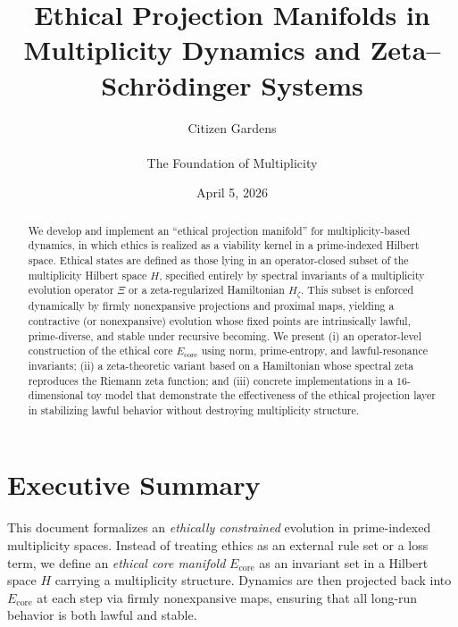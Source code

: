 \documentclass[11pt]{article}
\title{Ethical Projection Manifolds in Multiplicity Dynamics and Zeta--Schr\"odinger Systems}
\author{Citizen Gardens \\ \\ The Foundation of Multiplicity}
\date{April 5, 2026}
\begin{document}
\maketitle

\begin{abstract}
We develop and implement an ``ethical projection manifold'' for multiplicity-based dynamics,
in which ethics is realized as a viability kernel in a prime-indexed Hilbert space. 
Ethical states are defined as those lying in an operator-closed subset
of the multiplicity Hilbert space $H$, specified entirely by spectral invariants of
a multiplicity evolution operator $\Xi$ or a zeta-regularized Hamiltonian $H_\zeta$.
This subset is enforced dynamically by firmly nonexpansive projections and proximal maps,
yielding a contractive (or nonexpansive) evolution whose fixed points are intrinsically lawful,
prime-diverse, and stable under recursive becoming. We present
(i) an operator-level construction of the ethical core $E_{\mathrm{core}}$ using norm,
prime-entropy, and lawful-resonance invariants; (ii) a zeta-theoretic variant based on
a Hamiltonian whose spectral zeta reproduces the Riemann zeta function; and
(iii) concrete implementations in a $16$-dimensional toy model that demonstrate
the effectiveness of the ethical projection layer in stabilizing lawful behavior
without destroying multiplicity structure.
\end{abstract}

\newpage
\tableofcontents
\newpage
\section{Executive Summary}

This document formalizes an \emph{ethically constrained} evolution in prime-indexed multiplicity spaces.
Instead of treating ethics as an external rule set or a loss term, we define an \emph{ethical core manifold}
$E_{\mathrm{core}}$ as an invariant set in a Hilbert space $H$ carrying a multiplicity structure.
Dynamics are then projected back into $E_{\mathrm{core}}$ at each step via firmly nonexpansive maps,
ensuring that all long-run behavior is both lawful and stable.
\end{document}
